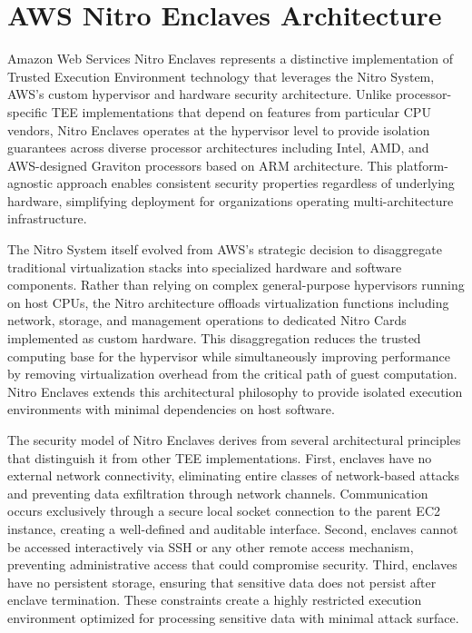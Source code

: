 \section{AWS Nitro Enclaves Architecture}

Amazon Web Services Nitro Enclaves represents a distinctive implementation of Trusted Execution Environment technology that leverages the Nitro System, AWS's custom hypervisor and hardware security architecture. Unlike processor-specific TEE implementations that depend on features from particular CPU vendors, Nitro Enclaves operates at the hypervisor level to provide isolation guarantees across diverse processor architectures including Intel, AMD, and AWS-designed Graviton processors based on ARM architecture. This platform-agnostic approach enables consistent security properties regardless of underlying hardware, simplifying deployment for organizations operating multi-architecture infrastructure.

The Nitro System itself evolved from AWS's strategic decision to disaggregate traditional virtualization stacks into specialized hardware and software components. Rather than relying on complex general-purpose hypervisors running on host CPUs, the Nitro architecture offloads virtualization functions including network, storage, and management operations to dedicated Nitro Cards implemented as custom hardware. This disaggregation reduces the trusted computing base for the hypervisor while simultaneously improving performance by removing virtualization overhead from the critical path of guest computation. Nitro Enclaves extends this architectural philosophy to provide isolated execution environments with minimal dependencies on host software.

The security model of Nitro Enclaves derives from several architectural principles that distinguish it from other TEE implementations. First, enclaves have no external network connectivity, eliminating entire classes of network-based attacks and preventing data exfiltration through network channels. Communication occurs exclusively through a secure local socket connection to the parent EC2 instance, creating a well-defined and auditable interface. Second, enclaves cannot be accessed interactively via SSH or any other remote access mechanism, preventing administrative access that could compromise security. Third, enclaves have no persistent storage, ensuring that sensitive data does not persist after enclave termination. These constraints create a highly restricted execution environment optimized for processing sensitive data with minimal attack surface.

